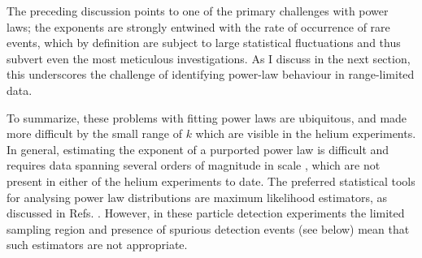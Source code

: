 	The preceding discussion points to one of the primary challenges with power laws; the exponents are strongly entwined with the rate of occurrence of rare events, which by definition are subject to large statistical fluctuations and thus subvert even the most meticulous investigations.
	As I discuss in the next section, this underscores the challenge of identifying power-law behaviour in range-limited data.
	

	To summarize, these problems with fitting power laws are ubiquitous, and made more difficult by the small range of $k$ which are visible in the helium experiments.
	In general, estimating the exponent of a purported power law is difficult and requires data spanning several orders of magnitude in scale \cite{Goldstein04,Clauset09,Virkar14,Hanel17}, which are not present in either {of the} helium experiment{s to date}.
	The preferred statistical tools for analysing power law distributions are maximum likelihood estimators, as discussed in Refs. \cite{Clauset09,Virkar14}.
	However, in these particle detection experiments the limited sampling region and presence of spurious detection events (see below) mean that such estimators are not appropriate.
	


